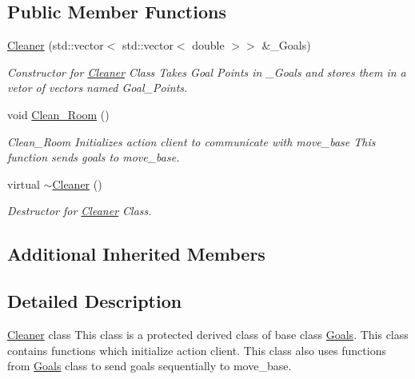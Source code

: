 \subsection*{Public Member Functions}
\begin{DoxyCompactItemize}
\item 
\hyperlink{classCleaner_abca01c3dfb02f02c20a3ec278bb874ba}{Cleaner} (std\+::vector$<$ std\+::vector$<$ double $>$$>$ \&\+\_\+\+Goals)
\begin{DoxyCompactList}\small\item\em Constructor for \hyperlink{classCleaner}{Cleaner} Class Takes Goal Points in \+\_\+\+Goals and stores them in a vetor of vectors named Goal\+\_\+\+Points. \end{DoxyCompactList}\item 
void \hyperlink{classCleaner_a6a742590ac6256a15fcfaf6853fd6a97}{Clean\+\_\+\+Room} ()\hypertarget{classCleaner_a6a742590ac6256a15fcfaf6853fd6a97}{}\label{classCleaner_a6a742590ac6256a15fcfaf6853fd6a97}

\begin{DoxyCompactList}\small\item\em Clean\+\_\+\+Room Initializes action client to communicate with move\+\_\+base This function sends goals to move\+\_\+base. \end{DoxyCompactList}\item 
virtual \hyperlink{classCleaner_a86f390999d60ee10a0e53a5946369d9d}{$\sim$\+Cleaner} ()\hypertarget{classCleaner_a86f390999d60ee10a0e53a5946369d9d}{}\label{classCleaner_a86f390999d60ee10a0e53a5946369d9d}

\begin{DoxyCompactList}\small\item\em Destructor for \hyperlink{classCleaner}{Cleaner} Class. \end{DoxyCompactList}\end{DoxyCompactItemize}
\subsection*{Additional Inherited Members}


\subsection{Detailed Description}
\hyperlink{classCleaner}{Cleaner} class This class is a protected derived class of base class \hyperlink{classGoals}{Goals}. This class contains functions which initialize action client. This class also uses functions from \hyperlink{classGoals}{Goals} class to send goals sequentially to move\+\_\+base. 

